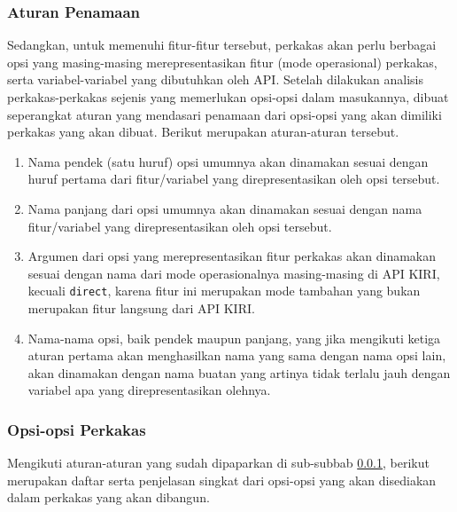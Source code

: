 \subsubsection{Aturan Penamaan}
\label{sec:analysis-thesisapp-features-conventions}

Sedangkan, untuk memenuhi fitur-fitur tersebut, perkakas akan perlu berbagai opsi yang masing-masing merepresentasikan fitur (mode operasional) perkakas, serta variabel-variabel yang dibutuhkan oleh API. Setelah dilakukan analisis perkakas-perkakas sejenis yang memerlukan opsi-opsi dalam masukannya, dibuat seperangkat aturan yang mendasari penamaan dari opsi-opsi yang akan dimiliki perkakas yang akan dibuat. Berikut merupakan aturan-aturan tersebut.

\begin{enumerate}
	\item Nama pendek (satu huruf) opsi umumnya akan dinamakan sesuai dengan huruf pertama dari fitur/variabel yang direpresentasikan oleh opsi tersebut.
	\item Nama panjang dari opsi umumnya akan dinamakan sesuai dengan nama fitur/variabel yang direpresentasikan oleh opsi tersebut.
	\item Argumen dari opsi yang merepresentasikan fitur perkakas akan dinamakan sesuai dengan nama dari mode operasionalnya masing-masing di API KIRI, kecuali \texttt{direct}, karena fitur ini merupakan mode tambahan yang bukan merupakan fitur langsung dari API KIRI.
	\item Nama-nama opsi, baik pendek maupun panjang, yang jika mengikuti ketiga aturan pertama akan menghasilkan nama yang sama dengan nama opsi lain, akan dinamakan dengan nama buatan yang artinya tidak terlalu jauh dengan variabel apa yang direpresentasikan olehnya.
\end{enumerate}

\subsubsection{Opsi-opsi Perkakas}
\label{sec:analysis-thesisapp-features-options}

Mengikuti aturan-aturan yang sudah dipaparkan di sub-subbab \ref{sec:analysis-thesisapp-features-conventions}, berikut merupakan daftar serta penjelasan singkat dari opsi-opsi yang akan disediakan dalam perkakas yang akan dibangun.

